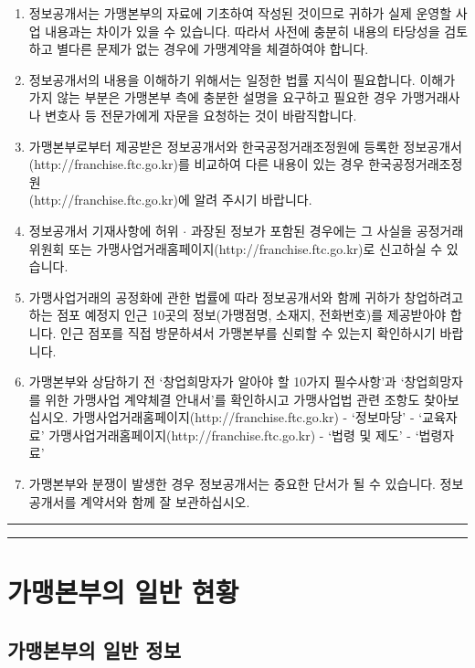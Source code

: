 \documentclass[a5paper,10pt]{oblivoir}
\newcommand\crule[3][black]{\textcolor{#1}{\rule{#2}{#3}}}
\begin{document}
\begin{enumerate}
\item[]
정보공개서는 가맹본부의 자료에 기초하여 작성된 것이므로 귀하가 실제 운영할
사업 내용과는 차이가 있을 수 있습니다. 따라서 사전에 충분히 내용의 타당성을
검토하고 별다른 문제가 없는 경우에 가맹계약을 체결하여야 합니다.
\item[]
정보공개서의 내용을 이해하기 위해서는 일정한 법률 지식이 필요합니다. 이해가
가지 않는 부분은 가맹본부 측에 충분한 설명을 요구하고 필요한 경우 가맹거래사나
변호사 등 전문가에게 자문을 요청하는 것이 바람직합니다.
\item[]
가맹본부로부터 제공받은 정보공개서와 한국공정거래조정원에 등록한 정보공개서
(http://franchise.ftc.go.kr)를 비교하여 다른 내용이 있는 경우 한국공정거래조정원\\
(http://franchise.ftc.go.kr)에 알려 주시기 바랍니다.
\item[]
정보공개서 기재사항에 허위 $\cdot$ 과장된 정보가 포함된 경우에는 그 사실을 공정거래
위원회 또는 가맹사업거래홈페이지(http://franchise.ftc.go.kr)로 신고하실 수
있습니다.
\item[]
가맹사업거래의 공정화에 관한 법률에 따라 정보공개서와 함께 귀하가 창업하려고
하는 점포 예정지 인근 10곳의 정보(가맹점명, 소재지, 전화번호)를 제공받아야
합니다. 인근 점포를 직접 방문하셔서 가맹본부를 신뢰할 수 있는지 확인하시기
바랍니다.
\item[]
가맹본부와 상담하기 전 ‘창업희망자가 알아야 할 10가지 필수사항’과 ‘창업희망자를
위한 가맹사업 계약체결 안내서’를 확인하시고 가맹사업법 관련 조항도 찾아보십시오.
가맹사업거래홈페이지(http://franchise.ftc.go.kr) - ‘정보마당’ - ‘교육자료’
가맹사업거래홈페이지(http://franchise.ftc.go.kr) - ‘법령 및 제도’ - ‘법령자료’
\item[]
가맹본부와 분쟁이 발생한 경우 정보공개서는 중요한 단서가 될 수 있습니다.
정보공개서를 계약서와 함께 잘 보관하십시오.
\end{enumerate}


\newpage
\begin{center}
\crule[red]{4cm}{0.1cm} \crule[blue]{4cm}{0.1cm}
\end{center}

\section{ 가맹본부의 일반 현황}
\subsection{ 가맹본부의 일반 정보}
\end{document}
